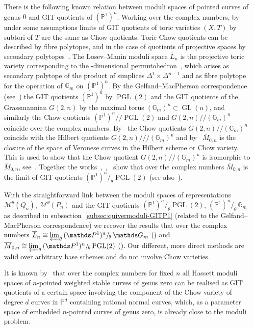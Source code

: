 \documentclass[ALCO,ThmDefs,Unicode,epreuves]{cedram}
\def\G{\mathds G}
\def\P{\mathds P}
\DeclareMathOperator{\GL}{GL}
\DeclareMathOperator{\PGL}{PGL}
\begin{document}
There is the following known relation between moduli spaces of pointed curves 
of genus $0$ and GIT quotients of $(\P^1)^n$.
Working over the complex numbers, by~\cite{KSZ91} under some assumptions
limits of GIT quotients of toric varieties $(X,T)$ by subtori of $T$ 
are the same as Chow quotients. 
Toric Chow quotients can be described by fibre polytopes, and in the case of 
quotients of projective spaces by secondary polytopes~\cite{KSZ91, GKZ}.
The Losev--Manin moduli space $\overline{L}_n$ is the projective toric variety
corresponding to the %
{}-dimensional permutohedron~\cite{LM00}, which arises 
as secondary polytope of the product of simplices $\Delta^1\times\Delta^{n-1}$ 
and as fibre polytope for the operation of $\G_m$ 
on $(\P^1)^n$. 
By the Gelfand--MacPherson correspondence (see~\cite{Ka93a}) the GIT quotients 
$(\P^1)^n$ by $\PGL(2)$ and the GIT quotients of the Grassmannian $G(2,n)$ 
by the maximal torus $(\G_m)^n\subset\GL(n)$, and similarly the Chow quotients 
$(\P^1)^n/\!\!/\PGL(2)$ and $G(2,n)/\!\!/(\G_m)^n$ coincide over the complex numbers. 
By~\cite{Ka93a} the Chow quotients $G(2,n)/\!\!/(\G_m)^n$ coincide with the 
Hilbert quotients
$G(2,n)/\!\!/\!\!/(\G_m)^n$ and by~\cite{Ka93b} $\overline{M}_{0,n}$ 
is the closure of the space of Veronese curves in the Hilbert scheme or Chow variety.
This is used to show that the Chow quotient $G(2,n)/\!\!/(\G_m)^n$ is isomorphic
to $\overline{M}_{0,n}$, see~\cite[(4.1.8)]{Ka93a}.
Together the works~\cite{Ka93a},~\cite{Ka93b},~\cite{KSZ91} show that over
the complex numbers $\overline{M}_{0,n}$ is the limit of GIT quotients 
$(\P^1)^n/_{\!\theta}\PGL(2)$ (see also~\cite{Th99}).

With the straightforward link between the moduli spaces of representations
$\mathcal M^\theta(Q_n)$, $\mathcal M^\theta(P_n)$ and the GIT quotients 
$(\P^1)^n/_{\!\theta}\PGL(2)$, $(\P^1)^n/_{\!\theta}\,\G_m$ as described
in subsection~\ref{subsec:quivermoduli-GITP1}
(related to the Gelfand--MacPherson correspondence) we recover the results that 
over the complex numbers
$\overline{L}_n\cong\varprojlim_\theta\,(\P^1)^n/_{\!\theta}\,\G_m$
(\cite{KSZ91, LM00}) and
$\overline{M}_{0,n}\cong\varprojlim_\theta\,(\P^1)^n/_{\!\theta}\PGL(2)$
(\cite{Ka93a}).
Our different, more direct methods are valid over arbitrary base schemes and
do not involve Chow varieties.


It is known by~\cite{GJM13} that over the complex numbers for fixed $n$ all 
Hassett moduli spaces of $n$-pointed weighted stable curves of genus zero 
can be realised as GIT quotients of a certain space involving the component of 
the Chow variety of degree $d$ curves in $\P^d$ containing rational normal curves, 
which, as a parameter space of embedded $n$-pointed curves of genus zero, is already 
close to the moduli problem.
\end{document}
